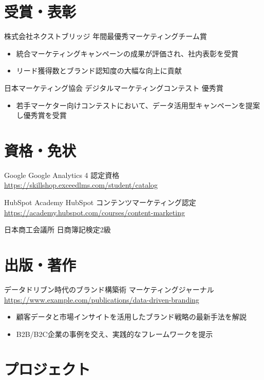 \documentclass[a4paper, serif, 10pt]{moderncv}
\begin{document}
\section{受賞・表彰}

        {株式会社ネクストブリッジ}
        {年間最優秀マーケティングチーム賞}
        {}
        {}
        {\begin{itemize}
\item 統合マーケティングキャンペーンの成果が評価され、社内表彰を受賞
\item リード獲得数とブランド認知度の大幅な向上に貢献
\end{itemize}}

        {日本マーケティング協会}
        {デジタルマーケティングコンテスト 優秀賞}
        {}
        {}
        {\begin{itemize}
\item 若手マーケター向けコンテストにおいて、データ活用型キャンペーンを提案し優秀賞を受賞
\end{itemize}}
\section{資格・免状}

        {Google}
        {Google Analytics 4 認定資格}
        {\url{https://skillshop.exceedlms.com/student/catalog}}
        {}
        {}

        {HubSpot Academy}
        {HubSpot コンテンツマーケティング認定}
        {\url{https://academy.hubspot.com/courses/content-marketing}}
        {}
        {}

        {日本商工会議所}
        {日商簿記検定2級}
        {}
        {}
        {}
\section{出版・著作}

        {データドリブン時代のブランド構築術}
        {マーケティングジャーナル}
        {\url{https://www.example.com/publications/data-driven-branding}}
        {}
        {\begin{itemize}
\item 顧客データと市場インサイトを活用したブランド戦略の最新手法を解説
\item B2B/B2C企業の事例を交え、実践的なフレームワークを提示
\end{itemize}}
\section{プロジェクト}
\end{document}
